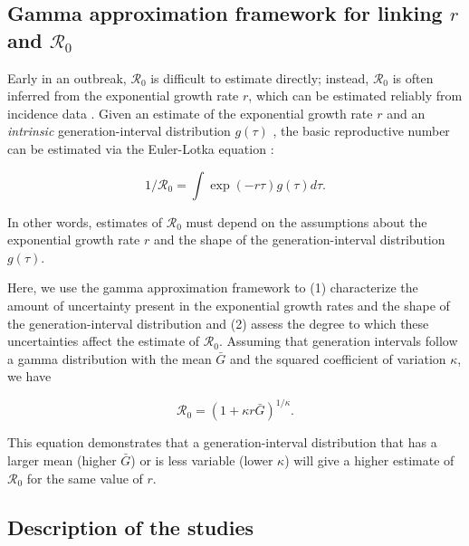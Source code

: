 \documentclass[12pt]{article}
\newcommand{\Rx}[1]{\ensuremath{{\mathcal R}_{#1}}}
\newcommand{\Ro}{\Rx{0}\xspace}
\begin{document}
\subsection{Gamma approximation framework for linking $r$ and $\mathcal R_0$}

Early in an outbreak, \Ro is difficult to estimate directly;
instead, \Ro is often inferred from the exponential growth rate $r$, which can be estimated reliably from incidence data \citep{mills2004transmissibility, nishiura2009transmission, ma2014estimating}.
Given an estimate of the exponential growth rate $r$ and an \emph{intrinsic} generation-interval distribution $g(\tau)$ \citep{champredon2015intrinsic}, the basic reproductive
number can be estimated via the Euler-Lotka equation \citep{wallinga2007generation}:
\begin{linenomath*}
\begin{equation}
1/\mathcal R_0 = \int \exp(-r\tau) g(\tau) d\tau.
\label{eq:euler}
\end{equation}
\end{linenomath*}
In other words, estimates of \Ro must
depend on the assumptions about the
exponential growth rate $r$ and the shape of the generation-interval distribution $g(\tau)$.

Here, we use the gamma approximation framework \citep{mcbryde2009early, nishiura2009transmission, roberts2011early, park2019practical} to (1) characterize the amount of uncertainty present in the exponential growth rates and the shape of the generation-interval distribution and (2) assess the degree to which these uncertainties affect the estimate of \Ro.
Assuming that generation intervals follow a gamma distribution
with the mean $\bar G$ and the squared coefficient of variation $\kappa$, 
we have
\begin{linenomath*}
\begin{equation}
\mathcal R_0 = \left(1 + \kappa r \bar{G}\right)^{1/\kappa}.
\label{eq:gamma}
\end{equation}
\end{linenomath*}
This equation demonstrates that a generation-interval distribution
that has a larger mean (higher $\bar{G}$) or is less variable (lower $\kappa$)
will give a higher estimate of \Ro for the same value of $r$.

\subsection{Description of the studies}
\end{document}
